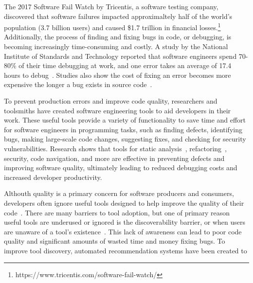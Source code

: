 \documentclass[conference]{IEEEtran}
\begin{document}
The 2017 Software Fail Watch by Tricentis, a software testing company, discovered that software failures impacted approximaltely half of the world's population (3.7 billion users) and caused \$1.7 trillion in financial losses.\footnote{https://www.tricentis.com/software-fail-watch/} Additionally, the process of finding and fixing bugs in code, or debugging, is becoming increasingly time-consuming and costly.  A study by the National Institute of Standards and Technology reported that software engineers spend 70-80\% of their time debugging at work, and one error takes an average of 17.4 hours to debug~\cite{NIST}. Studies also show the cost of fixing an error becomes more expensive the longer a bug exists in source code~\cite{SEEconomics, SoftwareAssuranceSDLC}.

To prevent production errors and improve code quality, researchers and toolsmiths have created software engineering tools to aid developers in their work. These useful tools provide a variety of functionality to save time and effort for software engineers in programming tasks, such as finding defects, identifying bugs, making large-scale code changes, suggesting fixes, and checking for security vulnerabilities. Research shows that tools for static analysis~\cite{UsingStaticAnalysis}, refactoring~\cite{Murphy-HillFitness}, security, code navigation, and more are effective in preventing defects and improving software quality, ultimately leading to reduced debugging costs and increased developer productivity.

Althouth quality is a primary concern for software producers and consumers, developers often ignore useful tools designed to help improve the quality of their code~\cite{Johnson2013Why}. There are many barriers to tool adoption, but one of primary reason useful tools are underused or ignored is the discoverability barrier, or when users are unaware of a tool's existence~\cite{Murphy-HillScreencastingDiscovery}. This lack of awareness can lead to poor code quality and significant amounts of wasted time and money fixing bugs. To improve tool discovery, automated recommendation systems have been created to 

\end{document}
